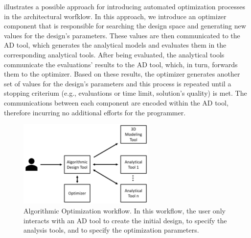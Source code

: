  illustrates a possible approach for introducing automated optimization processes in the architectural worfklow. In this approach, we introduce an optimizer component that is responsible for searching the design space and generating new values for the design's parameters. These values are then communicated to the \ac{AD} tool, which generates the analytical models and evaluates them in the corresponding analytical tools. After being evaluated, the analytical tools communicate the evaluations' results to the \ac{AD} tool, which, in turn, forwards them to the optimizer. Based on these results, the optimizer generates another set of values for the design's parameters and this process is repeated until a stopping criterium (e.g., evaluations or time limit, solution's quality) is met. The communications between each component are encoded within the \ac{AD} tool, therefore incurring no additional efforts for the programmer.
 
 \begin{figure}[htbp]
 	\centering
 	\includegraphics[width=0.6\textwidth]{./Images/Solution/algorithmic_optimization.png}
 	\caption{Algorithmic Optimization workflow. In this workflow, the user only interacts with an \ac{AD} tool to create the initial design, to specify the analysis tools, and to specify the optimization parameters.}
 	\label{fig:algorithmicoptimization}
 \end{figure}
 
